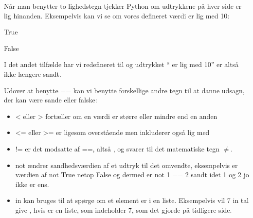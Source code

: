 \documentclass[letterpaper,10pt,english]{jupyterBook}
\begin{document}
Når man benytter to lighedstegn \sphinxcode{\sphinxupquote{==}} tjekker Python om udtrykkene på hver side er lig hinanden. Eksempelvis kan vi se om vores defineret værdi er lig med 10:


\begin{sphinxVerbatim}[commandchars=\\\{\}]
   
   
\end{sphinxVerbatim}

\begin{sphinxVerbatim}[commandchars=\\\{\}]
True
\end{sphinxVerbatim}

\begin{sphinxVerbatim}[commandchars=\\\{\}]
   
   
\end{sphinxVerbatim}

\begin{sphinxVerbatim}[commandchars=\\\{\}]
False
\end{sphinxVerbatim}

I det andet tilfælde har vi redefineret  til  og udtrykket “ er lig med 10” er altså ikke længere sandt.

Udover at benytte == kan vi benytte forskellige andre tegn til at danne udsagn, der kan være sande eller falske:
\begin{itemize}
\item {} 
< eller > fortæller om en værdi er større eller mindre end en anden

\item {} 
<= eller >= er ligesom overstående men inkluderer også lig med

\item {} 
!= er det modsatte af ==, altså , og svarer til det matematiske tegn \(\neq\).

\item {} 
not ændrer sandhedsværdien af et udtryk til det omvendte, eksempelvis er værdien af not True netop False og dermed er not 1 == 2 sandt idet 1 og 2 jo ikke er ens.

\item {} 
in kan bruges til at spørge om et element er i en liste. Eksempelvis vil 7 in tal give , hvis  er en liste, som indeholder 7, som det gjorde på tidligere side.

\end{itemize}
\end{document}
